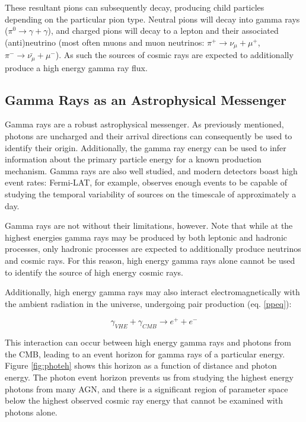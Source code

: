 These resultant pions can subsequently decay, producing child particles depending on the particular pion type. Neutral pions will decay into gamma rays ($\pi^0 \rightarrow \gamma + \gamma$), and charged pions will decay to a lepton and their associated (anti)neutrino (most often muons and muon neutrinos: $\pi^+ \rightarrow \nu_{\mu} + \mu^+$, $\pi^- \rightarrow \bar{\nu_{\mu}} + \mu^-$). As such the sources of cosmic rays are expected to additionally produce a high energy gamma ray flux.

\subsection{Gamma Rays as an Astrophysical Messenger}
Gamma rays are a robust astrophysical messenger. As previously mentioned, photons are uncharged and their arrival directions can consequently be used to identify their origin. Additionally, the gamma ray energy can be used to infer information about the primary particle energy for a known production mechanism. Gamma rays are also well studied, and modern detectors boast high event rates: Fermi-LAT, for example, observes enough events to be capable of studying the temporal variability of sources on the timescale of approximately a day. 

Gamma rays are not without their limitations, however. Note that while at the highest energies gamma rays may be produced by both leptonic and hadronic processes, only hadronic processes are expected to additionally produce neutrinos and cosmic rays. For this reason, high energy gamma rays alone cannot be used to identify the source of high energy cosmic rays. 

Additionally, high energy gamma rays may also interact electromagnetically with the ambient radiation in the universe, undergoing pair production (eq. \ref{ppeq}):

\begin{equation}
    \gamma_{VHE} + \gamma_{CMB} \rightarrow e^+ + e^-
\label{ppeq}
\end{equation}

This interaction can occur between high energy gamma rays and photons from the CMB, leading to an event horizon for gamma rays of a particular energy. Figure \ref{fig:photeh} shows this horizon as a function of distance and photon energy. The photon event horizon prevents us from studying the highest energy photons from many AGN, and there is a significant region of parameter space below the highest observed cosmic ray energy that cannot be examined with photons alone. 

